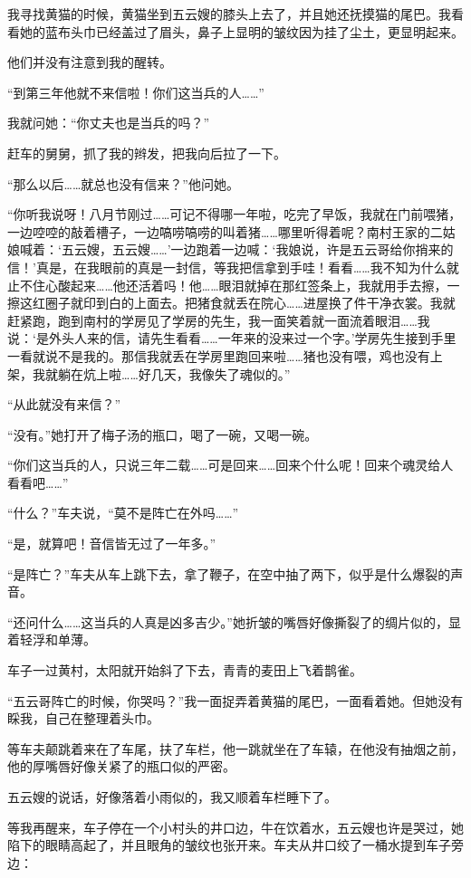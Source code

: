 \par 我寻找黄猫的时候，黄猫坐到五云嫂的膝头上去了，并且她还抚摸猫的尾巴。我看看她的蓝布头巾已经盖过了眉头，鼻子上显明的皱纹因为挂了尘土，更显明起来。
\par 他们并没有注意到我的醒转。
\par “到第三年他就不来信啦！你们这当兵的人……”
\par 我就问她：“你丈夫也是当兵的吗？”
\par 赶车的舅舅，抓了我的辫发，把我向后拉了一下。
\par “那么以后……就总也没有信来？”他问她。
\par “你听我说呀！八月节刚过……可记不得哪一年啦，吃完了早饭，我就在门前喂猪，一边啌啌的敲着槽子，一边嗃唠嗃唠的叫着猪……哪里听得着呢？南村王家的二姑娘喊着：‘五云嫂，五云嫂……’一边跑着一边喊：‘我娘说，许是五云哥给你捎来的信！’真是，在我眼前的真是一封信，等我把信拿到手哇！看看……我不知为什么就止不住心酸起来……他还活着吗！他……眼泪就掉在那红签条上，我就用手去擦，一擦这红圈子就印到白的上面去。把猪食就丢在院心……进屋换了件干净衣裳。我就赶紧跑，跑到南村的学房见了学房的先生，我一面笑着就一面流着眼泪……我说：‘是外头人来的信，请先生看看……一年来的没来过一个字。’学房先生接到手里一看就说不是我的。那信我就丢在学房里跑回来啦……猪也没有喂，鸡也没有上架，我就躺在炕上啦……好几天，我像失了魂似的。”
\par “从此就没有来信？”
\par “没有。”她打开了梅子汤的瓶口，喝了一碗，又喝一碗。
\par “你们这当兵的人，只说三年二载……可是回来……回来个什么呢！回来个魂灵给人看看吧……”
\par “什么？”车夫说，“莫不是阵亡在外吗……”
\par “是，就算吧！音信皆无过了一年多。”
\par “是阵亡？”车夫从车上跳下去，拿了鞭子，在空中抽了两下，似乎是什么爆裂的声音。
\par “还问什么……这当兵的人真是凶多吉少。”她折皱的嘴唇好像撕裂了的绸片似的，显着轻浮和单薄。
\par 车子一过黄村，太阳就开始斜了下去，青青的麦田上飞着鹊雀。
\par “五云哥阵亡的时候，你哭吗？”我一面捉弄着黄猫的尾巴，一面看着她。但她没有睬我，自己在整理着头巾。
\par 等车夫颠跳着来在了车尾，扶了车栏，他一跳就坐在了车辕，在他没有抽烟之前，他的厚嘴唇好像关紧了的瓶口似的严密。
\par 五云嫂的说话，好像落着小雨似的，我又顺着车栏睡下了。
\par 等我再醒来，车子停在一个小村头的井口边，牛在饮着水，五云嫂也许是哭过，她陷下的眼睛高起了，并且眼角的皱纹也张开来。车夫从井口绞了一桶水提到车子旁边：
